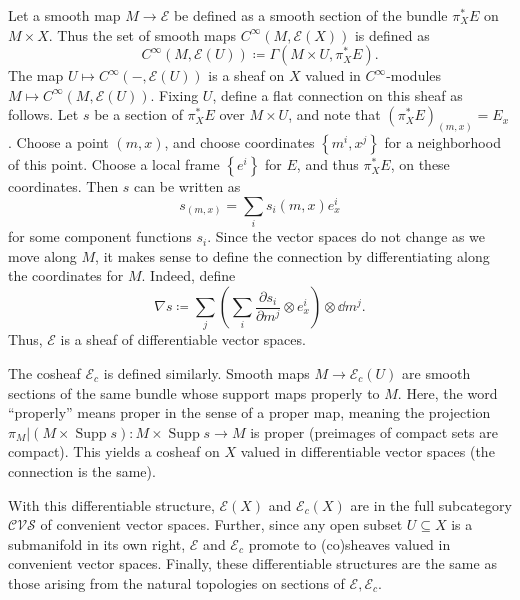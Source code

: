Let a smooth map $M\to \mathcal{E} $ be defined as a smooth section of the bundle $\pi^*_XE$ on $M\times X$. Thus the set of smooth maps $C^\infty (M,\mathcal{E} (X))$ is defined as
\[
	C^\infty (M,\mathcal{E} (U)) \coloneqq \Gamma (M\times U, \pi_X^*E)
.\]
The map $U\mapsto C^\infty (-,\mathcal{E} (U))$ is a sheaf on $X$ valued in $C^\infty $-modules $M\mapsto C^\infty (M,\mathcal{E} (U))$. Fixing $U$, define a flat connection on this sheaf as follows. Let $s$ be a section of $\pi _X^*E$ over $M\times U$, and note that $(\pi _X^*E)_{(m,x)} =E_x$. Choose a point $(m,x)$, and choose coordinates $\left\{ m^i,x^j \right\}$ for a neighborhood of this point. Choose a local frame $\left\{ e^i \right\} $ for $E$, and thus $\pi _X^*E$, on these coordinates. Then $s$ can be written as
\[
	s_{(m,x)} =\sum_{i} s_i(m,x)e^i_x
\]
for some component functions $s_i$. Since the vector spaces do not change as we move along $M$, it makes sense to define the connection by differentiating along the coordinates for $M$. Indeed, define
\[
	\nabla s \coloneqq \sum_{j} \left( \sum_{i} \frac{\partial s_i}{\partial m^j} \otimes e^i_x \right) \otimes \dd m^j
.\]
Thus, $\mathcal{E} $ is a sheaf of differentiable vector spaces.

The cosheaf $\mathcal{E} _c$ is defined similarly. Smooth maps $M\to \mathcal{E} _c(U)$ are smooth sections of the same bundle whose support maps properly to $M$. Here, the word ``properly'' means proper in the sense of a proper map, meaning the projection $\pi _M|(M\times \operatorname{Supp}s) : M\times \operatorname{Supp} s \to M$ is proper (preimages of compact sets are compact). This yields a cosheaf on $X$ valued in differentiable vector spaces (the connection is the same).
\begin{theorem}\label{thm:3-5-18}
	With this differentiable structure, $\mathcal{E} (X)$ and $\mathcal{E} _c(X)$ are in the full subcategory $\mathcal{CVS} $ of convenient vector spaces. Further, since any open subset $U\subseteq X$ is a submanifold in its own right, $\mathcal{E} $ and $\mathcal{E} _c$ promote to (co)sheaves valued in convenient vector spaces. Finally, these differentiable structures are the same as those arising from the natural topologies on sections of $\mathcal{E} ,\mathcal{E}_c$.
\end{theorem}

